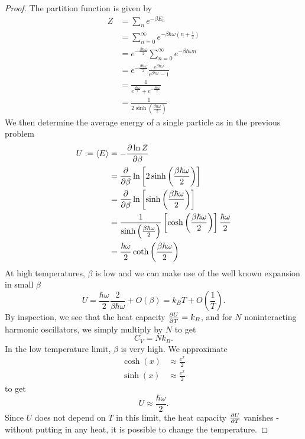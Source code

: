 \begin{proof}
	The partition function is given by
	\begin{align*}
		Z &= \sum_n e^{-\beta E_n} \\
		  &= \sum_{n=0}^{\infty} e^{-\beta\hbar\omega \left( n+\frac{1}{2} \right) } \\
		  &= e^{-\frac{\beta \hbar\omega}{2}} \sum_{n=0}^{\infty} e^{-\beta\hbar\omega n}\\
		  &= e^{-\frac{\beta \hbar\omega}{2}} \frac{e^{\beta \hbar\omega}}{e^{\beta \hbar\omega}-1}\\
		  &= \frac{1}{e^{\frac{\beta \hbar\omega}{2}} + e^{-\frac{\beta \hbar\omega}{2}}} \\
		  &= \frac{1}{2\sinh \left( \frac{\beta \hbar\omega}{2} \right) }
	\end{align*}
	We then determine the average energy of a single particle as in the previous problem
	\begin{align*}
		U:= \langle E \rangle &= -\pdv{\ln Z}{\beta} \\
				      &= \pdv{\beta}\ln \left[ 2\sinh\left( \frac{\beta \hbar\omega}{2} \right)  \right]  \\
				      &= \pdv{\beta}\ln \left[ \sinh\left( \frac{\beta \hbar\omega}{2} \right)  \right]  \\
				      &=\frac{1}{\sinh\left( \frac{\beta \hbar\omega}{2} \right) } \left[ \cosh\left( \frac{\beta \hbar\omega}{2} \right)  \right] \frac{\hbar\omega}{2}\\
				      &= \frac{\hbar\omega}{2}\coth\left( \frac{\beta \hbar\omega}{2} \right) 
	\end{align*}
	At high temperatures, $\beta$ is low and we can make use of the well known expansion in small $\beta$ 
	\[
	U = \frac{\hbar\omega}{2} \frac{2}{\beta \hbar\omega}+ O(\beta)=k_B T + O\left( \frac{1}{T} \right) 
	.\] 
	By inspection, we see that the heat capacity $\pdv{U}{T}=k_B$, and for $N$ noninteracting harmonic oscillators, we simply multiply by $N$ to get
	\[
	C_V = N k_B
	.\] 
	In the low temperature limit, $\beta$ is very high. We approximate
	\begin{align*}
		\cosh(x) &\approx \frac{e^x}{2}\\
		\sinh(x) &\approx \frac{e^x}{2}
	\end{align*}
	to get
	\[
	U\approx \frac{\hbar\omega}{2}
	.\] 
	Since $U$ does not depend on $T$ in this limit, the heat capacity $\pdv{U}{T} $ vanishes - without putting in any heat, it is possible to change the temperature.
\end{proof}
